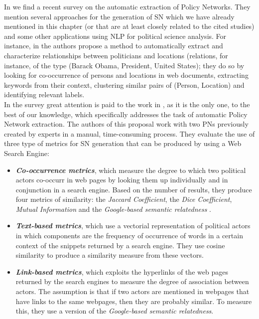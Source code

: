 In \cite{chaudhari2014survey} we find a recent survey on the automatic extraction of Policy Networks. They mention several approaches for the generation of SN which we have already mentioned in this chapter (or that are at least closely related to the cited studies) and some other applications using NLP for political science analysis. For instance, in \cite{politician-location} the authors propose a method to automatically extract and characterize relationships between politicians and locations (relations, for instance, of the type (Barack Obama, President, United States); they do so by looking for co-occurrence of persons and locations in web documents, extracting keywords from their context, clustering similar pairs of (Person, Location) and identifying relevant labels. \\

In the survey great attention is paid to the work in  \cite{policy-networks}, as it is the only one, to the best of our knowledge, which specifically addresses the task of automatic Policy Network extraction. The authors of this proposal work with two PNs previously created by experts in a manual, time-consuming process. They evaluate the use of three type of metrics for SN generation that can be produced by using a Web Search Engine:

\begin{itemize}
\item \textbf{\emph{Co-occurrence metrics}}, which measure the degree to which two political actors co-occurr in web pages by looking them up individually and in conjunction in a search engine. Based on the number of results, they produce four metrics of similarity: the \emph{Jaccard Coefficient}, the \emph{Dice Coefficient}, \emph{Mutual Information} and the \emph{Google-based semantic relatedness} \cite{google-similarity-measure}.
\item \textbf{\emph{Text-based metrics}}, which use a vectorial representation of political actors in which components are the frequency of occurrence of words in a certain context of the snippets returned by a search engine. They use cosine similarity to produce a similarity measure from these vectors.
\item \textbf{\emph{Link-based metrics}}, which exploits the hyperlinks of the web pages returned by the search engines to measure the degree of association between actors. The assumption is that if two actors are mentioned in webpages that have links to the same webpages, then they are probably similar. To measure this, they use a version of the \emph{Google-based semantic relatedness}.
\end{itemize}

